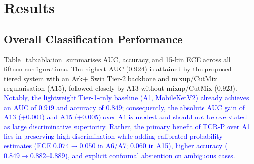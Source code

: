 \documentclass[diagnostics,article,submit,moreauthors]{Definitions/mdpi}
\newcommand{\rev}[1]{\textcolor{blue}{#1}}
\begin{document}
\section{Results}
\label{sec:results}

\subsection{Overall Classification Performance}

Table~\ref{tab:ablation} summarises AUC, accuracy, and 15-bin ECE across all fifteen configurations. The highest AUC ($0.924$) is attained by the proposed tiered system with an Ark+ Swin Tier-2 backbone and mixup/CutMix regularisation (A15), followed closely by A13 without mixup/CutMix ($0.923$). \rev{Notably, the lightweight Tier-1-only baseline (A1, MobileNetV2) already achieves an AUC of $0.919$ and accuracy of $0.849$; consequently, the absolute AUC gain of A13 ($+0.004$) and A15 ($+0.005$) over A1 is modest and should not be overstated as large discriminative superiority. Rather, the primary benefit of TCR-P over A1 lies in preserving high discrimination while adding calibrated probability estimates (ECE $0.074 \to 0.050$ in A6/A7; $0.060$ in A15), higher accuracy ($0.849 \to 0.882$--$0.889$), and explicit conformal abstention on ambiguous cases.}
\end{document}
